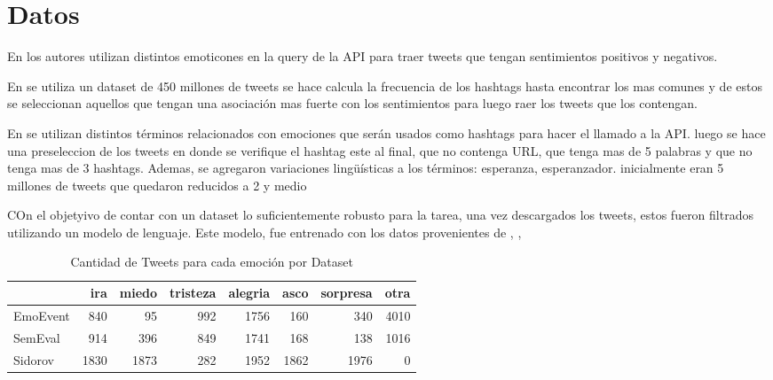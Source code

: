 \chapter{Datos}

En \cite{pak2010twitter} los autores utilizan distintos emoticones en la query de la API para traer tweets que tengan sentimientos positivos y negativos. 

En \cite{davidov2010enhanced} se utiliza un dataset de 450 millones de tweets se hace calcula la frecuencia de los hashtags hasta encontrar los mas comunes y de estos se seleccionan aquellos que tengan una asociación mas fuerte con los sentimientos para luego raer los tweets que los contengan.


En \cite{wang2012harnessing} se utilizan distintos términos relacionados con emociones que serán usados como hashtags para hacer el llamado a la API. luego se hace una preseleccion de los tweets en donde se verifique el hashtag este al final, que no contenga URL, que tenga mas de 5 palabras y que no tenga mas de 3 hashtags. Ademas, se agregaron variaciones lingüísticas a los términos: esperanza, esperanzador. inicialmente eran 5 millones de tweets que quedaron reducidos a 2 y medio


COn el objetyivo de contar con un dataset lo suficientemente robusto para la tarea, una vez descargados los tweets, estos fueron filtrados utilizando un modelo de lenguaje. Este modelo, fue entrenado con los datos provenientes de \cite{mohammad2018semeval}, \cite{sidorov2016construccion}, \cite{plaza2020emoevent}



\begin{table}[ht]
	\centering
	\caption{Cantidad de Tweets para cada emoción por Dataset}
\begin{tabular}{lrrrrrrr}
	\toprule
	{} &   ira &  miedo &  tristeza &  alegria &  asco &  sorpresa &  otra \\
	\midrule
	EmoEvent &   840 &     95 &       992 &     1756 &   160 &       340 &  4010 \\
	SemEval  &   914 &    396 &       849 &     1741 &   168 &       138 &  1016 \\
	Sidorov  &  1830 &   1873 &       282 &     1952 &  1862 &      1976 &     0 \\
	\bottomrule
\end{tabular}
\label{table:tweets_counts}
\end{table}